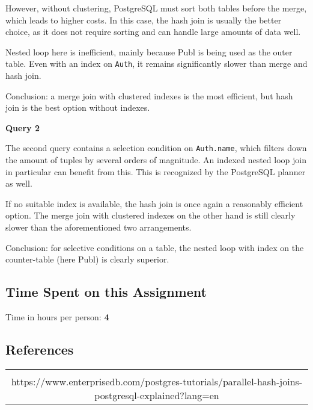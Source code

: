 \documentclass[11pt]{scrartcl}
\begin{document}
However, without clustering, PostgreSQL must sort both tables before the
merge, which leads to higher costs.  In this case, the hash join is
usually the better choice, as it does not require sorting and can handle
large amounts of data well.

Nested loop here is inefficient, mainly because Publ is being used as
the outer table.  Even with an index on \texttt{Auth}, it remains
significantly slower than merge and hash join.

Conclusion: a merge join with clustered indexes is the most efficient,
but hash join is the best option without indexes.

\textbf{Query 2}

The second query contains a selection condition on \texttt{Auth.name},
which filters down the amount of tuples by several orders of magnitude.
An indexed nested loop join in particular can benefit from this.  This
is recognized by the PostgreSQL planner as well.

If no suitable index is available, the hash join is once again a
reasonably efficient option.  The merge join with clustered indexes on
the other hand is still clearly slower than the aforementioned two
arrangements.

Conclusion: for selective conditions on a table, the nested loop with
index on the counter-table (here Publ) is clearly superior.

\subsection*{Time Spent on this Assignment}

Time in hours per person: \textbf{4}

\subsection*{References}

\begin{table}[H]
  \centering
  \begin{tabular}{c}
    \hline
    \tabularnewline
    https://www.enterprisedb.com/postgres-tutorials/parallel-hash-joins-postgresql-explained?lang=en
  \end{tabular}
\end{table}
\end{document}
